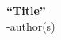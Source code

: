 \documentclass[12pt]{article}
\begin{document}
\begin{center}
    \large\textbf{``Title''}\\
    \normalsize-author(s)
\end{center}


\end{document}
